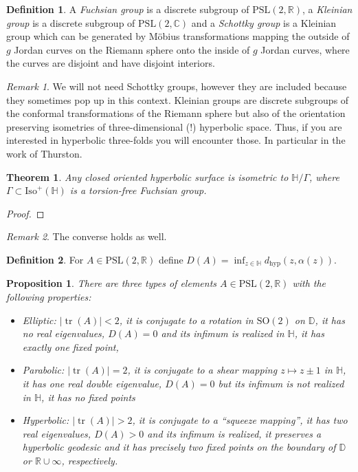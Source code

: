 \documentclass[a4paper]{article}
\newcommand{\RR}{\mathbb{R}}
\newcommand{\CC}{\mathbb{C}}
\newcommand{\HH}{\mathbb{H}}
\newcommand{\DD}{\mathbb{D}}
\newcommand{\hyp}{\text{hyp}}
\newcommand{\tr}{\operatorname{tr}}
\newcommand{\PSL}{\mathrm{PSL}}
\newcommand{\Iso}{\mathrm{Iso}^+}
\newcommand{\SO}{\mathrm{SO}}
\newtheorem*{thm}{Theorem}
\newtheorem*{prop}{Proposition}
\theoremstyle{definition}
\newtheorem*{definition}{Definition}
\theoremstyle{remark}
\newtheorem*{rmk}{Remark}
\theoremstyle{remark}
\begin{document}
\begin{definition}
  A \emph{Fuchsian group} is a discrete subgroup of $\PSL(2,\RR)$, a \emph{Kleinian group} is a discrete subgroup of $\PSL(2,\CC)$ and a \emph{Schottky group} is a Kleinian group which can be generated by Möbius transformations mapping the outside of $g$ Jordan curves on the Riemann sphere onto the inside of $g$ Jordan curves, where the curves are disjoint and have disjoint interiors.
\end{definition}

\begin{rmk}
  We will not need Schottky groups, however they are included because they sometimes pop up in this context. Kleinian groups are discrete subgroups of the conformal transformations of the Riemann sphere but also of the orientation preserving isometries of three-dimensional (!) hyperbolic space. Thus, if you are interested in hyperbolic three-folds you will encounter those. In particular in the work of Thurston.
\end{rmk}

\begin{thm}
  Any closed oriented hyperbolic surface is isometric to $\HH/\Gamma$, where $\Gamma\subset\Iso(\HH)$ is a torsion-free Fuchsian group.
\end{thm}

\begin{proof}
  
\end{proof}

\begin{rmk}
  The converse holds as well.
\end{rmk}

\begin{definition}
  For $A\in\PSL(2,\RR)$ define $D(A)=\inf_{z\in\HH} d_{\hyp}(z,\alpha(z))$.
\end{definition}

\begin{prop}
  There are three types of elements $A\in\PSL(2,\RR)$ with the following properties:
  \begin{itemize}
  \item \emph{Elliptic}: $|\tr (A)|<2$, it is conjugate to a rotation in $\SO(2)$ on $\DD$, it has no real eigenvalues, $D(A)=0$ and its infimum is realized in $\HH$, it has exactly one fixed point, 
  \item \emph{Parabolic}: $|\tr(A)|=2$, it is conjugate to a shear mapping $z\mapsto z\pm1$ in $\HH$, it has one real double eigenvalue, $D(A)=0$ but its infimum is not realized in $\HH$, it has no fixed points 
  \item \emph{Hyperbolic}: $|\tr(A)|>2$, it is conjugate to a ``squeeze mapping'', it has two real eigenvalues, $D(A)>0$ and its infimum is realized, it preserves a hyperbolic geodesic and it has precisely two fixed points on the boundary of $\DD$ or $\RR\cup\infty$, respectively.
  \end{itemize}
\end{prop}
\end{document}
